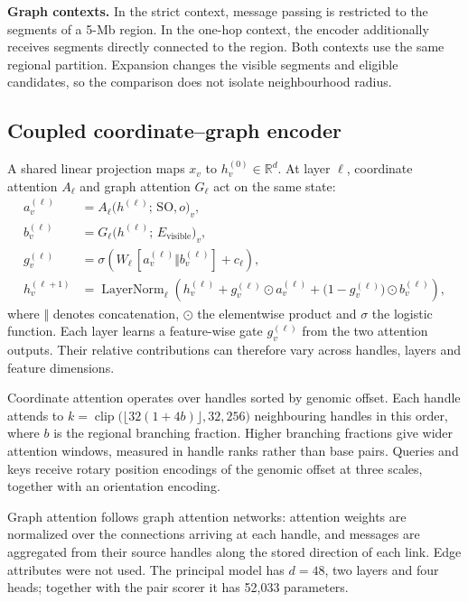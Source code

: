 \documentclass[11pt]{article}
\begin{document}
\begin{bibunit}[unsrtnat]
\textbf{Graph contexts.} In the strict context, message passing is restricted to the segments of a 5-Mb region. In the one-hop context, the encoder additionally receives segments directly connected to the region. Both contexts use the same regional partition. Expansion changes the visible segments and eligible candidates, so the comparison does not isolate neighbourhood radius.

\subsection{Coupled coordinate--graph encoder}
\label{sec:architecture}

A shared linear projection maps $x_v$ to $h_v^{(0)}\in\mathbb{R}^{d}$. At layer $\ell$, coordinate attention $A_\ell$ and graph attention $G_\ell$ act on the same state:
\begin{align}
a_v^{(\ell)}&=A_\ell\big(h^{(\ell)};\,\mathrm{SO},o\big)_v,\\
b_v^{(\ell)}&=G_\ell\big(h^{(\ell)};\,E_{\mathrm{visible}}\big)_v,\\
g_v^{(\ell)}&=\sigma\!\left(W_\ell\,[a_v^{(\ell)}\Vert b_v^{(\ell)}]+c_\ell\right),\\
h_v^{(\ell+1)}&=\operatorname{LayerNorm}_\ell\!\left(h_v^{(\ell)}+g_v^{(\ell)}\odot a_v^{(\ell)}+\big(1-g_v^{(\ell)}\big)\odot b_v^{(\ell)}\right),
\end{align}
where $\Vert$ denotes concatenation, $\odot$ the elementwise product and $\sigma$ the logistic function. Each layer learns a feature-wise gate $g_v^{(\ell)}$ from the two attention outputs. Their relative contributions can therefore vary across handles, layers and feature dimensions.

Coordinate attention operates over handles sorted by genomic offset. Each handle attends to $k=\operatorname{clip}\!\big(\lfloor 32(1+4b)\rfloor,32,256\big)$ neighbouring handles in this order, where $b$ is the regional branching fraction. Higher branching fractions give wider attention windows, measured in handle ranks rather than base pairs. Queries and keys receive rotary position encodings\cite{su2021roformer} of the genomic offset at three scales, together with an orientation encoding.

Graph attention follows graph attention networks\cite{velickovic2018gat}: attention weights are normalized over the connections arriving at each handle, and messages are aggregated from their source handles along the stored direction of each link. Edge attributes were not used. The principal model has $d=48$, two layers and four heads; together with the pair scorer it has 52,033 parameters.


\end{bibunit}
\end{document}
